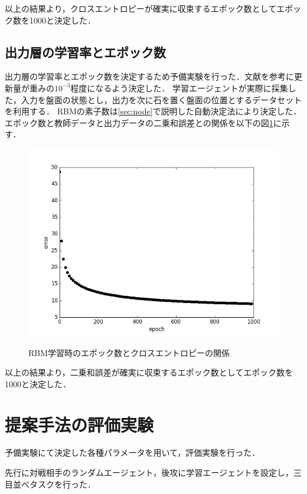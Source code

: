 以上の結果より，クロスエントロピーが確実に収束するエポック数としてエポック数を1000と決定した．

\subsection{出力層の学習率とエポック数}
出力層の学習率とエポック数を決定するため予備実験を行った．文献\cite{Hinton-guide}を参考に更新量が重みの$10^{-3}$程度になるよう決定した．
学習エージェントが実際に採集した，入力を盤面の状態とし，出力を次に石を置く盤面の位置とするデータセットを利用する．
RBMの素子数は\ref{sec:node}で説明した自動決定法により決定した．
エポック数と教師データと出力データの二乗和誤差との関係を以下の図\ref{fig:tu}に示す．

\begin{figure}[]
\begin{center}
   \includegraphics[scale=0.8]{./koki/t.png} \\
   \caption{RBM学習時のエポック数とクロスエントロピーの関係}
\label{fig:tu}
\end{center}
\end{figure}

以上の結果より，二乗和誤差が確実に収束するエポック数としてエポック数を1000と決定した．

\section{提案手法の評価実験}
予備実験にて決定した各種パラメータを用いて，評価実験を行った．

先行に対戦相手のランダムエージェント，後攻に学習エージェントを設定し，三目並べタスクを行った．

